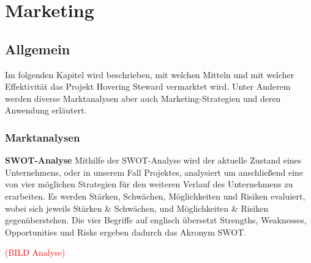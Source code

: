 \chapter{Marketing}
\renewcommand{\kapitelautor}{Autor: Markus Kaiser}

\section{Allgemein}
Im folgenden Kapitel wird beschrieben, mit welchen Mitteln und mit welcher Effektivität
das Projekt Hovering Steward vermarktet wird. Unter Anderem werden diverse Marktanalysen
aber auch Marketing-Strategien und deren Anwendung erläutert.

  \subsection{Marktanalysen}
  \textbf{SWOT-Analyse}
  Mithilfe der SWOT-Analyse wird der aktuelle Zustand eines Unternehmens, oder in unserem Fall Projektes, analysiert um anschließend eine von vier möglichen Strategien
  für den weiteren Verlauf des Unternehmens zu erarbeiten. Es werden Stärken, Schwächen, Möglichkeiten und Risiken evaluiert, wobei sich jeweils Stärken \& Schwächen, und
  Möglichkeiten \& Risiken gegenüberstehen. Die vier Begriffe auf englisch übersetzt Strengths, Weaknesses, Opportunities und Risks ergeben dadurch das Akronym SWOT.

  \textcolor{red}{(BILD Analyse)}

